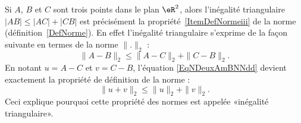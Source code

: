 \begin{remark}
	Si $A$, $B$ et $C$ sont trois points dans le plan $\eR^2$, alors l'inégalité triangulaire $| AB |\leq| AC |+| CB |$ est précisément la propriété~\ref{ItemDefNormeiii} de la norme (définition~\ref{DefNorme}). En effet l'inégalité triangulaire s'exprime de la façon suivante en termes de la norme $\| . \|_2$ :
	\begin{equation}	\label{EqNDeuxAmBNNdd}
		\| A-B \|_2\leq \| A-C \|_2+\| C-B \|_2.
	\end{equation}
	En notant $u=A-C$ et $v=C-B$, l'équation \eqref{EqNDeuxAmBNNdd} devient exactement la propriété de définition de la norme :
	\begin{equation}
		\| u+v \|_2\leq \| u \|_2+\| v \|_2.
	\end{equation}
	Ceci explique pourquoi cette propriété des normes est appelée «inégalité triangulaire».
\end{remark}
